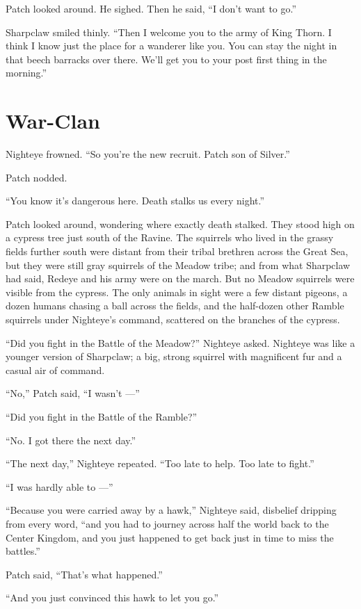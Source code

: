 \documentclass[12pt]{memoir}
\begin{document}
Patch looked around. He sighed. Then he said, “I don’t want to go.”

Sharpclaw smiled thinly. “Then I welcome you to the army of King
Thorn. I think I know just the place for a wanderer like you. You can
stay the night in that beech barracks over there. We’ll get you to
your post first thing in the morning.”


\section{War-Clan}

Nighteye frowned. “So you’re the new recruit. Patch son of Silver.”

Patch nodded.

“You know it’s dangerous here. Death stalks us every night.”

Patch looked around, wondering where exactly death stalked. They stood
high on a cypress tree just south of the Ravine. The squirrels who
lived in the grassy fields further south were distant from their
tribal brethren across the Great Sea, but they were still gray
squirrels of the Meadow tribe; and from what Sharpclaw had said,
Redeye and his army were on the march. But no Meadow squirrels were
visible from the cypress. The only animals in sight were a few distant
pigeons, a dozen humans chasing a ball across the fields, and the
half-dozen other Ramble squirrels under Nighteye’s command, scattered
on the branches of the cypress.

“Did you fight in the Battle of the Meadow?” Nighteye asked. Nighteye
was like a younger version of Sharpclaw; a big, strong squirrel with
magnificent fur and a casual air of command.

“No,” Patch said, “I wasn’t —”

“Did you fight in the Battle of the Ramble?”

“No. I got there the next day.”

“The next day,” Nighteye repeated. “Too late to help. Too late to
fight.”

“I was hardly able to —”

“Because you were carried away by a hawk,” Nighteye said, disbelief
dripping from every word, “and you had to journey across half the
world back to the Center Kingdom, and you just happened to get back
just in time to miss the battles.”

Patch said, “That’s what happened.”

“And you just convinced this hawk to let you go.”
\end{document}
